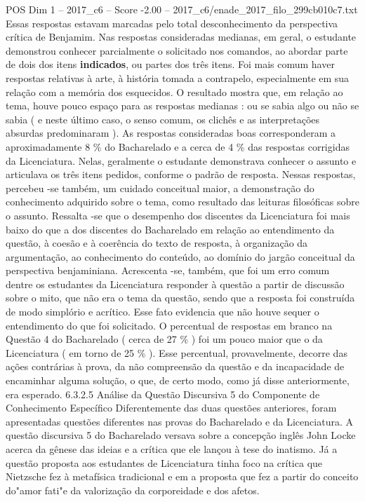 \begin{textsample}{POS Dim 1 – 2017\_c6 – Score -2.00 – 2017\_c6/enade\_2017\_filo\_299cb010c7.txt}
Essas respostas estavam marcadas pelo total desconhecimento da perspectiva crítica de Benjamim.
Nas respostas consideradas medianas, em geral, o estudante demonstrou conhecer parcialmente o solicitado nos comandos, ao abordar parte de dois dos itens \textbf{indicados}, ou partes dos três itens.
Foi mais comum haver respostas relativas à arte, à história tomada a contrapelo, especialmente em sua relação com a memória dos esquecidos.
O resultado mostra que, em relação ao tema, houve pouco espaço para as respostas medianas : ou se sabia algo ou não se sabia ( e neste último caso, o senso comum, os clichês e as interpretações absurdas predominaram ).
As respostas consideradas boas corresponderam a aproximadamente 8 \% do Bacharelado e a cerca de 4 \% das respostas corrigidas da Licenciatura.
Nelas, geralmente o estudante demonstrava conhecer o assunto e articulava os três itens pedidos, conforme o padrão de resposta.
Nessas respostas, percebeu -se também, um cuidado conceitual maior, a demonstração do conhecimento adquirido sobre o tema, como resultado das leituras filosóficas sobre o assunto.
Ressalta -se que o desempenho dos discentes da Licenciatura foi mais baixo do que a dos discentes do Bacharelado em relação ao entendimento da questão, à coesão e à coerência do texto de resposta, à organização da argumentação, ao conhecimento do conteúdo, ao domínio do jargão conceitual da perspectiva benjaminiana.
Acrescenta -se, também, que foi um erro comum dentre os estudantes da Licenciatura responder à questão a partir de discussão sobre o mito, que não era o tema da questão, sendo que a resposta foi construída de modo simplório e acrítico.
Esse fato evidencia que não houve sequer o entendimento do que foi solicitado.
O percentual de respostas em branco na Questão 4 do Bacharelado ( cerca de 27 \% ) foi um pouco maior que o da Licenciatura ( em torno de 25 \% ).
Esse percentual, provavelmente, decorre das ações contrárias à prova, da não compreensão da questão e da incapacidade de encaminhar alguma solução, o que, de certo modo, como já disse anteriormente, era esperado. 6.3.2.5 Análise da Questão Discursiva 5 do Componente de Conhecimento Específico Diferentemente das duas questões anteriores, foram apresentadas questões diferentes nas provas do Bacharelado e da Licenciatura.
A questão discursiva 5 do Bacharelado versava sobre a concepção inglês John Locke acerca da gênese das ideias e a crítica que ele lançou à tese do inatismo.
Já a questão proposta aos estudantes de Licenciatura tinha foco na crítica que Nietzsche fez à metafísica tradicional e em a proposta que fez a partir do conceito do"amor fati"e da valorização da corporeidade e dos afetos.

\end{textsample}
